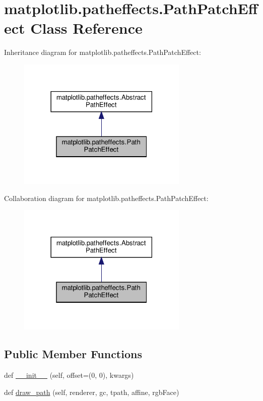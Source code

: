 \hypertarget{classmatplotlib_1_1patheffects_1_1PathPatchEffect}{}\section{matplotlib.\+patheffects.\+Path\+Patch\+Effect Class Reference}
\label{classmatplotlib_1_1patheffects_1_1PathPatchEffect}


Inheritance diagram for matplotlib.\+patheffects.\+Path\+Patch\+Effect\+:
\nopagebreak
\begin{figure}[H]
\begin{center}
\leavevmode
\includegraphics[width=230pt]{classmatplotlib_1_1patheffects_1_1PathPatchEffect__inherit__graph}
\end{center}
\end{figure}


Collaboration diagram for matplotlib.\+patheffects.\+Path\+Patch\+Effect\+:
\nopagebreak
\begin{figure}[H]
\begin{center}
\leavevmode
\includegraphics[width=230pt]{classmatplotlib_1_1patheffects_1_1PathPatchEffect__coll__graph}
\end{center}
\end{figure}
\subsection*{Public Member Functions}
\begin{DoxyCompactItemize}
\item 
def \hyperlink{classmatplotlib_1_1patheffects_1_1PathPatchEffect_a4000d0d10c3a1099f0d77d5c965c1747}{\+\_\+\+\_\+init\+\_\+\+\_\+} (self, offset=(0, 0), kwargs)
\item 
def \hyperlink{classmatplotlib_1_1patheffects_1_1PathPatchEffect_a7933413b2b187fc8c7404b2981a19dfa}{draw\+\_\+path} (self, renderer, gc, tpath, affine, rgb\+Face)
\end{DoxyCompactItemize}
